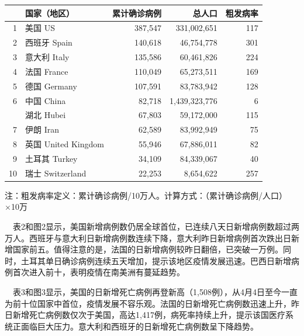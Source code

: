 \documentclass[]{article}
\begin{document}
\begin{table}[H]
  \vspace{-7mm}
    \caption{累计确诊前十位国家}
      \vspace{-0.5\baselineskip}
      \centering \begin{table}[H]
\centering
\begin{tabular}{rlrrr}
\toprule
  & 国家（地区） & 累计确诊病例 & 总人口 & 粗发病率\\
\midrule
\rowcolor{gray!6}  1 & 美国 US & 387,547 & 331,002,651 & 117\\
2 & 西班牙 Spain & 140,618 & 46,754,778 & 301\\
\rowcolor{gray!6}  3 & 意大利 Italy & 135,586 & 60,461,826 & 224\\
4 & 法国 France & 110,049 & 65,273,511 & 169\\
\rowcolor{gray!6}  5 & 德国 Germany & 107,591 & 83,783,942 & 128\\
6 & 中国 China & 82,718 & 1,439,323,776 & 6\\
\rowcolor{gray!6}   & 湖北 Hubei & 67,803 & 59,172,000 & 115\\
7 & 伊朗 Iran & 62,589 & 83,992,949 & 75\\
\rowcolor{gray!6}  8 & 英国 United Kingdom & 55,946 & 67,886,011 & 82\\
9 & 土耳其 Turkey & 34,109 & 84,339,067 & 40\\
\rowcolor{gray!6}  10 & 瑞士 Switzerland & 22,253 & 8,654,622 & 257\\
\bottomrule
\end{tabular}
\end{table} \begin{tablenotes}
        \footnotesize
        \item 注：粗发病率定义：累计确诊病例/10万人。计算方式：（累计确诊病例/人口）×10万  %
      \end{tablenotes}
    \end{table}

\newpage

\(\quad\)表2和图2显示，美国新增病例数仍居全球首位，已连续八天日新增病例数超过两万人。西班牙与意大利日新增病例数连续下降，意大利昨日新增病例首次跌出日新增国家前五。值得注意的是，法国的日新增病例较昨日翻倍，已突破一万例。同时，土耳其单日确诊病例连续五天增加，提示该地区疫情发展迅速。巴西日新增病例首次进入前十，表明疫情在南美洲有蔓延趋势。

\(\quad\)表3和图3显示，美国的日新增死亡病例再登新高（1,508例），从4月4日至今一直为前十位国家中首位，疫情发展不容乐观。法国的日新增死亡病例数迅速上升，昨日新增死亡病例数仅次于美国，高达1,417例，病死率持续上升，提示该国医疗系统正面临巨大压力。意大利和西班牙的日新增死亡病例数呈下降趋势。
\end{document}
